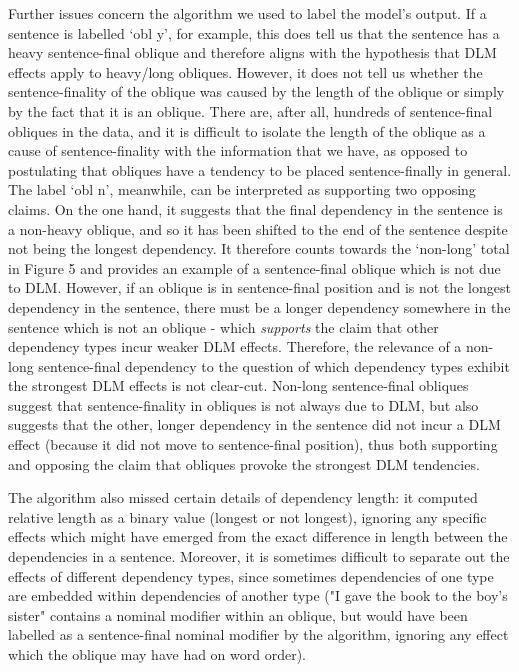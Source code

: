 \documentclass{article}
\begin{document}
Further issues concern the algorithm we used to label the model's output. If a sentence is labelled `obl y', for example, this does tell us that the sentence has a heavy sentence-final oblique and therefore aligns with the hypothesis that DLM effects apply to heavy/long obliques. However, it does not tell us whether the sentence-finality of the oblique was caused by the length of the oblique or simply by the fact that it is an oblique. There are, after all, hundreds of sentence-final obliques in the data, and it is difficult to isolate the length of the oblique as a cause of sentence-finality with the information that we have, as opposed to postulating that obliques have a tendency to be placed sentence-finally in general. The label `obl n', meanwhile, can be interpreted as supporting two opposing claims. On the one hand, it suggests that the final dependency in the sentence is a non-heavy oblique, and so it has been shifted to the end of the sentence despite not being the longest dependency. It therefore counts towards the `non-long' total in Figure 5 and provides an example of a sentence-final oblique which is not due to DLM. However, if an oblique is in sentence-final position and is not the longest dependency in the sentence, there must be a longer dependency somewhere in the sentence which is not an oblique - which \textit{supports} the claim that other dependency types incur weaker DLM effects. Therefore, the relevance of a non-long sentence-final dependency to the question of which dependency types exhibit the strongest DLM effects is not clear-cut. Non-long sentence-final obliques suggest that sentence-finality in obliques is not always due to DLM, but also suggests that the other, longer dependency in the sentence did not incur a DLM effect (because it did not move to sentence-final position), thus both supporting and opposing the claim that obliques provoke the strongest DLM tendencies.

The algorithm also missed certain details of dependency length: it computed relative length as a binary value (longest or not longest), ignoring any specific effects which might have emerged from the exact difference in length between the dependencies in a sentence. Moreover, it is sometimes difficult to separate out the effects of different dependency types, since sometimes dependencies of one type are embedded within dependencies of another type ("I gave the book to the boy's sister" contains a nominal modifier within an oblique, but would have been labelled as a sentence-final nominal modifier by the algorithm, ignoring any effect which the oblique may have had on word order).
\end{document}
